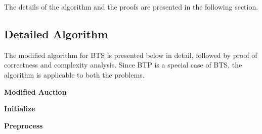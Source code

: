 \documentclass[11pt]{article}
\begin{document}
The details of the algorithm and the proofs are presented in the following section.






\subsection{Detailed Algorithm}
\label{sec_details}

 The modified  algorithm for BTS is presented below in detail, followed by 
proof of correctness and complexity analysis. Since BTP is a special case
of BTS, the algorithm is applicable to both the problems.

\begin{algorithm}
\caption{ {\bf Modified Auction}}
\begin{algorithmic}[1]

\vspace*{.1in}
\label{alg_modauc:line1}
\ELSE
{}
\ELSE
{}

\ENDIF
\ENDIF
{}
\ENDWHILE

\end{algorithmic}
\label{alg_modauc}
\end{algorithm}

\begin{algorithm}
\caption{{\bf Initialize}}
\begin{algorithmic}[1]
\vspace*{.1in}

\label{proc_modinit:line1}
\label{proc_modinit:line2}

\label{proc_modinit:line3}

\end{algorithmic} 

\label{proc_modinit}
\end{algorithm}


\begin{algorithm}
\caption{\bf Preprocess} 
\begin{algorithmic}[1]
\vspace*{.1in}

\STATE{} 
\label{proc_preprocess:line1}
\STATE {} 
\ENDIF
\ENDFOR


\end{algorithmic}
\label{proc_preprocess}
\end{algorithm}
\end{document}
